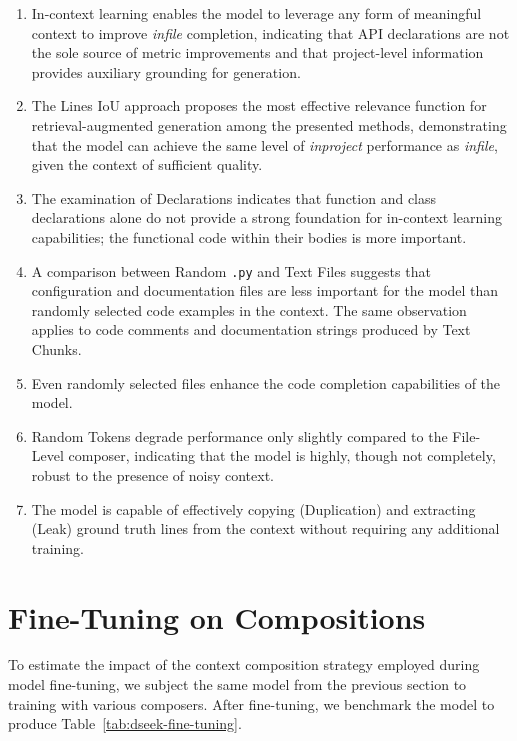 \begin{enumerate}
\item In-context learning enables the model to leverage any form of meaningful context to improve \textit{infile} completion, indicating that API declarations are not the sole source of metric improvements and that project-level information provides auxiliary grounding for generation.
\item The Lines IoU approach proposes the most effective relevance function for retrieval-augmented generation among the presented methods, demonstrating that the model can achieve the same level of \textit{inproject} performance as \textit{infile}, given the context of sufficient quality.
\item The examination of Declarations indicates that function and class declarations alone do not provide a strong foundation for in-context learning capabilities; the functional code within their bodies is more important.
\item A comparison between Random \texttt{.py} and Text Files suggests that configuration and documentation files are less important for the model than randomly selected code examples in the context. The same observation applies to code comments and documentation strings produced by Text Chunks.
\item Even randomly selected files enhance the code completion capabilities of the model.
\item Random Tokens degrade performance only slightly compared to the File-Level composer, indicating that the model is highly, though not completely, robust to the presence of noisy context.
\item The model is capable of effectively copying (Duplication) and extracting (Leak) ground truth lines from the context without requiring any additional training.
\end{enumerate}

\section{Fine-Tuning on Compositions}\label{sec:fine-tuning-on-compositions}

To estimate the impact of the context composition strategy employed during model fine-tuning, we subject the same model from the previous section to training with various composers. After fine-tuning, we benchmark the model to produce Table~\ref{tab:dseek-fine-tuning}.

